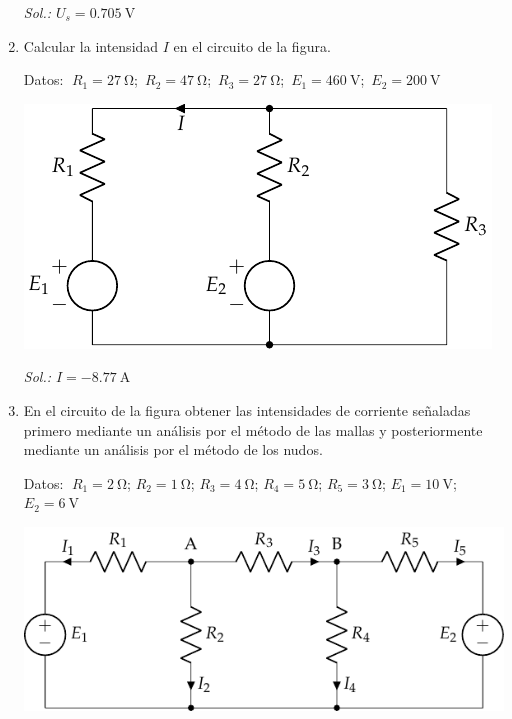 \begin{enumerate}
  \emph{Sol.:\; $U_s=\qty{0.705}{\volt}$}
	
	
\item Calcular la intensidad $I$ en el circuito de la figura.

    Datos: $\; R_1 = \qty{27}{\ohm}$;\, $R_2 = \qty{47}{\ohm}$;\, $R_3 = \qty{27}{\ohm}$;\, $E_1 = \qty{460}{\volt}$;\, $E_2 = \qty{200}{\volt}$
    
  \begin{center}
    \includegraphics{../figs/ej4_BT1.pdf}
  \end{center}

  \emph{Sol.:\; $I=\qty{-8.77}{\ampere}$}

		
\item En el circuito de la figura obtener las intensidades de
  corriente señaladas primero mediante un análisis por el método de
  las mallas y posteriormente mediante un análisis por el método de
  los nudos.

  Datos: $\; R_1 = \qty{2}{\ohm}$; $R_2 = \qty{1}{\ohm}$; $R_3 = \qty{4}{\ohm}$; $R_4 = \qty{5}{\ohm}$; $R_5 = \qty{3}{\ohm}$; $E_1 = \qty{10}{\volt}$; $E_2 = \qty{6}{\volt}$
  
  \begin{center}
    \includegraphics{../figs/ej8_BT1.pdf}
  \end{center}


\end{enumerate}
